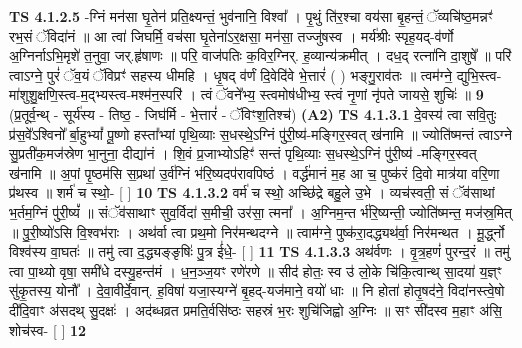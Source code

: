 \documentclass[17pt]{extarticle}
\begin{document}
                  \newline
                                \textbf{ TS 4.1.2.5} \newline
                  -ग्निं मन॑सा घृ॒तेन॑ प्रति॒क्ष्यन्तं॒ भुव॑नानि॒ विश्वा᳚ । पृ॒थुं ति॑र॒श्चा वय॑सा बृ॒हन्तं॒ ॅव्यचि॑ष्ठ॒मन्नꣳ॑ रभ॒सं ॅविदा॑नं ॥ आ त्वा॑ जिघर्मि॒ वच॑सा घृ॒तेना॑ऽर॒क्षसा॒ मन॑सा॒ तज्जु॑षस्व । मर्य॑श्रीः स्पृह॒यद्-व॑र्णो अ॒ग्निर्नाऽभि॒मृशे॑ त॒नुवा॒ जर्.हृ॑षाणः ॥ परि॒ वाज॑पतिः क॒विर॒ग्निर्. ह॒व्यान्य॑क्रमीत् । दध॒द् रत्ना॑नि दा॒शुषे᳚ ॥ परि॑ त्वाऽग्ने॒ पुरं॑ ॅव॒यं ॅविप्रꣳ॑ सहस्य धीमहि । धृ॒षद् व॑र्णं दि॒वेदि॑वे भे॒त्तारं॑ ( ) भङ्गु॒राव॑तः ॥ त्वम॑ग्ने॒ द्युभि॒स्त्व-मा॑शुशु॒क्षणि॒स्त्व-म॒द्भ्यस्त्व-मश्म॑न॒स्परि॑ । त्वं ॅवने᳚भ्य॒ स्त्वमोष॑धीभ्य॒ स्त्वं नृ॒णां नृ॑पते जायसे॒ शुचिः॑ ॥ \textbf{  9 } \newline
                  \newline
                      (प्र॒तूर्व॒न्थ् - सूर्य॑स्य - तिष्ठ॒ - जिघ॑र्मि - भे॒त्तारं॑ - ॅविꣳश॒तिश्च॑)  \textbf{(A2)} \newline \newline
                                        \textbf{ TS 4.1.3.1} \newline
                  दे॒वस्य॑ त्वा सवि॒तुः प्र॑स॒वे᳚ऽश्विनो᳚ र्बा॒हुभ्यां᳚ पू॒ष्णो हस्ता᳚भ्यां पृथि॒व्याः स॒धस्थे॒ऽग्निं पु॑री॒ष्य॑-मङ्गिर॒स्वत् ख॑नामि ॥ ज्योति॑ष्मन्तं त्वाऽग्ने सु॒प्रती॑क॒मज॑स्रेण भा॒नुना॒ दीद्या॑नं । शि॒वं प्र॒जाभ्योऽहिꣳ॑ सन्तं पृथि॒व्याः स॒धस्थे॒ऽग्निं पु॑री॒ष्य॑ -मङ्गिर॒स्वत् ख॑नामि ॥ अ॒पां पृ॒ष्ठम॑सि स॒प्रथा॑ उ॒र्व॑ग्निं भ॑रि॒ष्यदप॑रावपिष्ठं । वर्द्ध॑मानं म॒ह आ च॒ पुष्क॑रं दि॒वो मात्र॑या वरि॒णा प्र॑थस्व ॥ शर्म॑ च स्थो॒- [  ] \textbf{  10} \newline
                  \newline
                                \textbf{ TS 4.1.3.2} \newline
                  वर्म॑ च स्थो॒ अच्छि॑द्रे बहु॒ले उ॒भे । व्यच॑स्वती॒ सं ॅव॑साथां भ॒र्तम॒ग्निं पु॑री॒ष्यं᳚ ॥ संॅव॑साथाꣳ सुव॒र्विदा॑ स॒मीची॒ उर॑सा॒ त्मना᳚ । अ॒ग्निम॒न्त र्भ॑रि॒ष्यन्ती॒ ज्योति॑ष्मन्त॒ मज॑स्र॒मित् ॥ पु॒री॒ष्यो॑ऽसि वि॒श्वभ॑राः । अथ॑र्वा त्वा प्रथ॒मो निर॑मन्थदग्ने ॥ त्वाम॑ग्ने॒ पुष्क॑रा॒दद्ध्यथ॑र्वा॒ निर॑मन्थत । मू॒र्द्ध्नो विश्व॑स्य वा॒घतः॑ ॥ तमु॑ त्वा द॒द्ध्यङ्ङृषिः॑ पु॒त्र ई॑धे॒- [  ] \textbf{  11} \newline
                  \newline
                                \textbf{ TS 4.1.3.3} \newline
                  अथ॑र्वणः । वृ॒त्र॒हणं॑ पुरन्द॒रं ॥ तमु॑ त्वा पा॒थ्यो वृषा॒ समी॑धे दस्यु॒हन्त॑मं । ध॒न॒ञ्ज॒यꣳ रणे॑रणे ॥ सीद॑ होतः॒ स्व उ॑ लो॒के चि॑कि॒त्वान्थ् सा॒दया॑ य॒ज्ञ्ꣳ सु॑कृ॒तस्य॒ योनौ᳚ । दे॒वा॒वीर्दे॒वान्. ह॒विषा॑ यजा॒स्यग्ने॑ बृ॒हद्-यज॑माने॒ वयो॑ धाः ॥ नि होता॑ होतृ॒षद॑ने॒ विदा॑नस्त्वे॒षो दी॑दि॒वाꣳ अ॑सदथ् सु॒दक्षः॑ । अद॑ब्धव्रत प्रमति॒र्वसि॑ष्ठः सहस्रं भ॒रः शुचि॑जिह्वो अ॒ग्निः ॥ सꣳ सी॑दस्व म॒हाꣳ अ॑सि॒ शोच॑स्व- [  ] \textbf{  12} \newline
\end{document}
